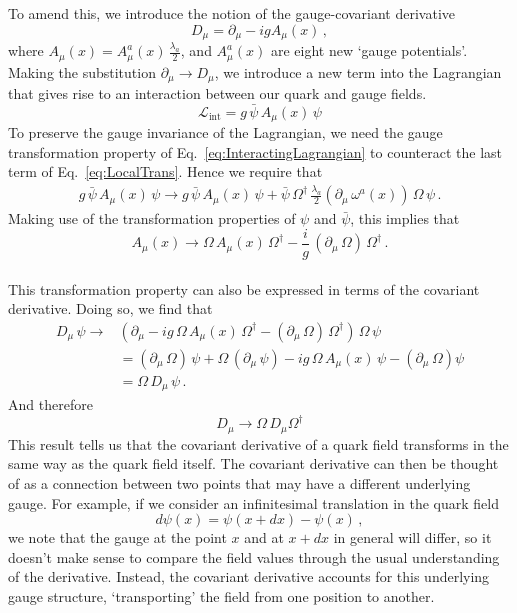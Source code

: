 %
To amend this, we introduce the notion of the gauge-covariant derivative
%
\begin{equation}
D_\mu = \partial_\mu - ig A_\mu(x)\, ,
\label{eq:CovariantDerivative}
\end{equation}
%
where $A_\mu(x)=A_\mu^a(x)\,\frac{\lambda_a}{2}$, and $A_\mu^a(x)$ are eight new `gauge potentials'. Making the substitution $\partial_\mu\rightarrow D_\mu$, we introduce a new term into the Lagrangian that gives rise to an interaction between our quark and gauge fields.
%
\begin{equation}
\mathcal{L}_\text{int} = g\,\bar{\psi}\,A_\mu(x)\,\psi
\label{eq:InteractingLagrangian}
\end{equation}
%
To preserve the gauge invariance of the Lagrangian, we need the gauge transformation property of Eq.~\ref{eq:InteractingLagrangian} to counteract the last term of Eq.~\ref{eq:LocalTrans}. Hence we require that
%
\begin{align}
g\,\bar{\psi}\,A_\mu(x)\,\psi \rightarrow g\,\bar{\psi}\,A_\mu(x)\,\psi + \bar{\psi}\,\Omega^\dag\,\frac{\lambda_a}{2}(\partial_\mu\,\omega^a(x))\,\Omega\,\psi\, .
\end{align}
%
Making use of the transformation properties of $\psi$ and $\bar{\psi}$, this implies that
%
\begin{equation}
A_\mu(x)\rightarrow \Omega\,A_\mu(x)\,\Omega^\dag - \frac{i}{g}\,(\partial_\mu\,\Omega)\,\Omega^\dag\, . 
\end{equation}\\
%

This transformation property can also be expressed in terms of the covariant derivative. Doing so, we find that
%
\begin{align*}
D_\mu\,\psi \rightarrow &\left(\partial_\mu -ig\,\Omega\,A_\mu(x)\,\Omega^\dag - (\partial_\mu\,\Omega)\,\Omega^\dag\right)\,\Omega\,\psi\\
&= (\partial_\mu\,\Omega)\,\psi + \Omega\,(\partial_\mu\,\psi) - ig\,\Omega\,A_\mu(x)\,\psi - (\partial_\mu\,\Omega)\psi\\
&=\Omega\,D_\mu\,\psi\, .
\end{align*}
%
And therefore
%
\begin{equation}
D_{\mu}\rightarrow\Omega\,D_\mu \Omega^\dag
\end{equation}
%
This result tells us that the covariant derivative of a quark field transforms in the same way as the quark field itself. The covariant derivative can then be thought of as a connection between two points that may have a different underlying gauge. For example, if we consider an infinitesimal translation in the quark field
%
\begin{equation*}
d\psi(x) = \psi(x+dx)-\psi(x)\, ,
\end{equation*} 
%
we note that the gauge at the point $x$ and at $x+dx$ in general will differ, so it doesn't make sense to compare the field values through the usual understanding of the derivative. Instead, the covariant derivative accounts for this underlying gauge structure, `transporting' the field from one position to another.\\

